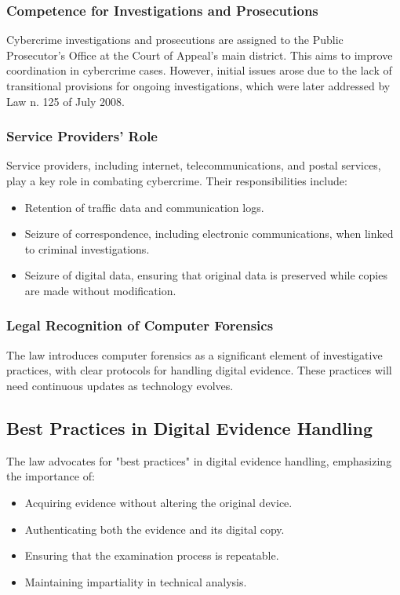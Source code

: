 \subsubsection{Competence for Investigations and Prosecutions}
Cybercrime investigations and prosecutions are assigned to the Public Prosecutor’s Office at the Court of Appeal’s main district. This aims to improve coordination in cybercrime cases. However, initial issues arose due to the lack of transitional provisions for ongoing investigations, which were later addressed by Law n. 125 of July 2008.

\subsubsection{Service Providers' Role}
Service providers, including internet, telecommunications, and postal services, play a key role in combating cybercrime. Their responsibilities include:
\begin{itemize}
    \item Retention of traffic data and communication logs.
    \item Seizure of correspondence, including electronic communications, when linked to criminal investigations.
    \item Seizure of digital data, ensuring that original data is preserved while copies are made without modification.
\end{itemize}

\subsubsection{Legal Recognition of Computer Forensics}
The law introduces computer forensics as a significant element of investigative practices, with clear protocols for handling digital evidence. These practices will need continuous updates as technology evolves.

\subsection{Best Practices in Digital Evidence Handling}
The law advocates for "best practices" in digital evidence handling, emphasizing the importance of:
\begin{itemize}
    \item Acquiring evidence without altering the original device.
    \item Authenticating both the evidence and its digital copy.
    \item Ensuring that the examination process is repeatable.
    \item Maintaining impartiality in technical analysis.
\end{itemize}

